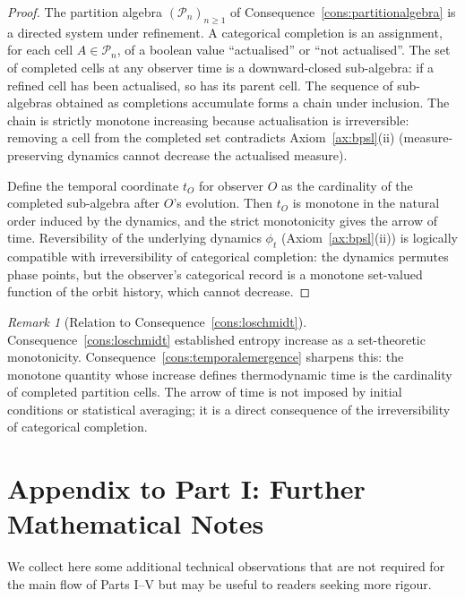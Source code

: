 \documentclass[11pt,twocolumn,a4paper]{article}
\theoremstyle{axiomstyle}
\theoremstyle{conseqstyle}
\theoremstyle{definition}
\theoremstyle{remark}
\newtheorem*{remark}{Remark}
\newcommand{\Partition}{\mathcal{P}}
\begin{document}
\begin{proof}
The partition algebra $(\Partition_{n})_{n\geq 1}$ of Consequence~\ref{cons:partitionalgebra} is a directed system under refinement. A categorical completion is an assignment, for each cell $A\in\Partition_{n}$, of a boolean value ``actualised'' or ``not actualised''. The set of completed cells at any observer time is a downward-closed sub-algebra: if a refined cell has been actualised, so has its parent cell. The sequence of sub-algebras obtained as completions accumulate forms a chain under inclusion. The chain is strictly monotone increasing because actualisation is irreversible: removing a cell from the completed set contradicts Axiom~\ref{ax:bpsl}(ii) (measure-preserving dynamics cannot decrease the actualised measure).

Define the temporal coordinate $t_{O}$ for observer $O$ as the cardinality of the completed sub-algebra after $O$'s evolution. Then $t_{O}$ is monotone in the natural order induced by the dynamics, and the strict monotonicity gives the arrow of time. Reversibility of the underlying dynamics $\phi_{t}$ (Axiom~\ref{ax:bpsl}(ii)) is logically compatible with irreversibility of categorical completion: the dynamics permutes phase points, but the observer's categorical record is a monotone set-valued function of the orbit history, which cannot decrease.
\end{proof}

\begin{remark}[Relation to Consequence~\ref{cons:loschmidt}]
Consequence~\ref{cons:loschmidt} established entropy increase as a set-theoretic monotonicity. Consequence~\ref{cons:temporalemergence} sharpens this: the monotone quantity whose increase defines thermodynamic time is the cardinality of completed partition cells. The arrow of time is not imposed by initial conditions or statistical averaging; it is a direct consequence of the irreversibility of categorical completion.
\end{remark}

\section*{Appendix to Part I: Further Mathematical Notes}

We collect here some additional technical observations that are not required for the main flow of Parts I--V but may be useful to readers seeking more rigour.
\end{document}
